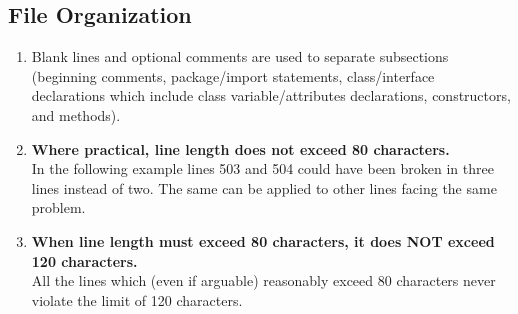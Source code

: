 \documentclass[a4paper,11pt]{report} %
\begin{document}
		\subsection*{File Organization}\begin{enumerate}[resume]
			\item Blank lines and optional comments are used to separate subsections (beginning comments, package/import statements, class/interface declarations which include class variable/attributes declarations, constructors, and methods).
			\item \textbf{Where practical, line length does not exceed 80 characters.}\smallskip \\
				In the following example lines 503 and 504 could have been broken in three lines instead of two. The same can be applied to other lines facing the same problem.
				
			\item \textbf{When line length must exceed 80 characters, it does NOT exceed 120 characters.}\smallskip \\
				All the lines which (even if arguable) reasonably exceed 80 characters never violate the limit of 120 characters.
		\end{enumerate}
		
\end{document}
